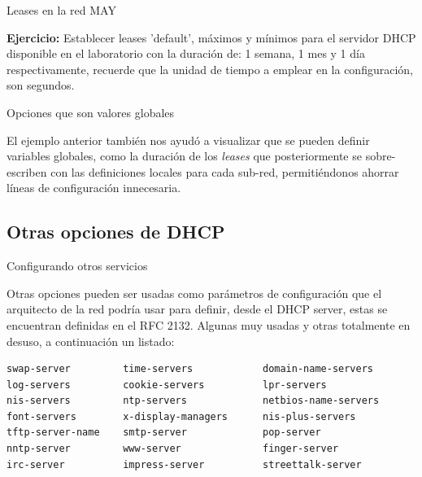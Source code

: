 \begin{frame}{Leases en la red MAY}
\framebreak

    \textbf{Ejercicio:} Establecer leases 'default', máximos y mínimos para el
    servidor DHCP disponible en el laboratorio con la duración de: 1 semana, 1
    mes y 1 día respectivamente, recuerde que la unidad de tiempo a emplear en
    la configuración, son segundos.\\[0.2cm]
    
\end{frame}

\begin{frame}{Opciones que son valores globales}

    El ejemplo anterior también nos ayudó a visualizar que se pueden definir
    variables globales, como la duración de los \textit{leases} que
    posteriormente se sobre-escriben con las definiciones locales para cada
    sub-red, permitiéndonos ahorrar líneas de configuración
    innecesaria.\\[0.2cm]
    
\end{frame}

\subsection{Otras opciones de DHCP} %
\label{sub:Otras opciones de DHCP}


\begin{frame}{Configurando otros servicios}
    
    Otras opciones pueden ser usadas como parámetros de configuración que el
    arquitecto de la red podría usar para definir, desde el DHCP server, estas
    se encuentran definidas en el RFC 2132. Algunas muy usadas y otras
    totalmente en desuso, a continuación un listado:

    \begin{verbatim}
swap-server         time-servers            domain-name-servers
log-servers         cookie-servers          lpr-servers
nis-servers         ntp-servers             netbios-name-servers
font-servers        x-display-managers      nis-plus-servers
tftp-server-name    smtp-server             pop-server
nntp-server         www-server              finger-server
irc-server          impress-server          streettalk-server 
    \end{verbatim} 

\end{frame}


